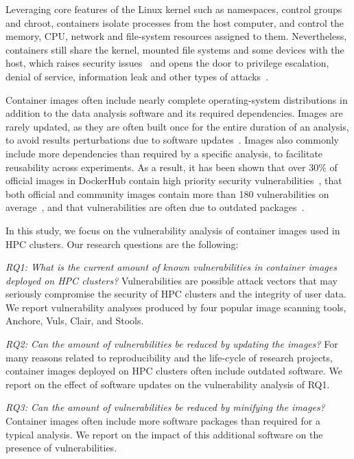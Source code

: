\documentclass[a4paper,num-refs]{oup-contemporary}
\begin{document}
Leveraging core features of the Linux kernel such as namespaces, control
groups and chroot, containers isolate processes from the host computer,  
and control the memory, CPU, network and file-system resources assigned to
them. Nevertheless, containers still share the kernel, mounted file systems
and some devices with the host, which raises security
issues~\cite{martin2018docker, sultan2019container, combe2016docker} and
opens the door to privilege escalation, denial of service, information
leak and other types of attacks~\cite{gantikow2016providing}. 


Container images often include nearly complete operating-system
distributions in addition to the data analysis software and its required
dependencies. Images are rarely updated, as they are often built once for
the entire duration of an analysis, to avoid results perturbations due to
software updates~\cite{gronenschild2012effects,
glatard2015reproducibility}. Images also commonly include more dependencies
than required by a specific analysis, to facilitate reusability across
experiments. As a result, it has been shown that over 30\% of official
images in DockerHub contain high priority security
vulnerabilities~\cite{gummaraju2015over}, that both official and community
images contain more than 180 vulnerabilities on average~\cite{Shu2017}, and
that vulnerabilities are often due to outdated
packages~\cite{zerouali2019relation}.

In this study, we focus on the vulnerability analysis of container images
used in HPC clusters.  
Our research questions are the following:

\textit{RQ1: What is the current amount of known vulnerabilities in
container images deployed on HPC clusters?} Vulnerabilities are possible
attack vectors that may seriously compromise the security of HPC clusters
and the integrity of user data. We report vulnerability analyses produced
by four popular image scanning tools, Anchore, Vuls, Clair, and Stools.

\textit{RQ2: Can the amount of vulnerabilities be reduced by updating the images?}  
For many reasons related to reproducibility and the life-cycle of research
projects, container images deployed on HPC clusters often include outdated
software. We report on the effect of software updates on the vulnerability
analysis of RQ1.

\textit{RQ3: Can the amount of vulnerabilities be reduced by minifying the images?} 
Container images often include more software packages than required for a
typical analysis. We report on the impact of this additional software on
the presence of vulnerabilities.
\end{document}
